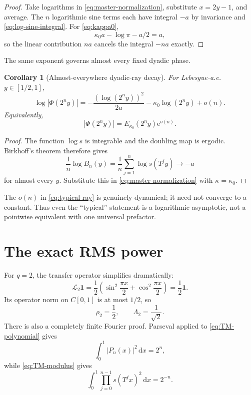 \documentclass[11pt,oneside]{article}
\newtheorem{corollary}[theorem]{Corollary}
\theoremstyle{definition}
\theoremstyle{remark}
\newcommand{\e}{\mathrm e}
\newcommand{\dd}{\,\mathrm d}
\newcommand{\Phiup}{\Phi}
\newcommand{\abs}[1]{\left|#1\right|}
\begin{document}
\begin{proof}
Take logarithms in \eqref{eq:master-normalization}, substitute $x=2y-1$, and average.
The $n$ logarithmic sine terms each have integral $-a$ by invariance and
\eqref{eq:log-sine-integral}.  For \eqref{eq:kappa0},
\[
 \kappa_0a-\log\pi-a/2=a,
\]
so the linear contribution $na$ cancels the integral $-na$ exactly.
\end{proof}

The same exponent governs almost every fixed dyadic phase.

\begin{corollary}[Almost-everywhere dyadic-ray decay]
\label{cor:typical-ray}
For Lebesgue-a.e. $y\in[1/2,1]$,
\begin{equation}
 \log\abs{\Phiup(2^ny)}
 =-\frac{(\log(2^ny))^2}{2a}
  -\kappa_0\log(2^ny)+o(n).
 \label{eq:typical-ray}
\end{equation}
Equivalently,
\[
 \abs{\Phiup(2^ny)}=E_{\kappa_0}(2^ny)\e^{o(n)}.
\]
\end{corollary}

\begin{proof}
The function $\log s$ is integrable and the doubling map is ergodic.  Birkhoff's theorem
therefore gives
\[
 \frac1n\log B_n(y)=\frac1n\sum_{j=1}^{n}\log s(T^jy)\longrightarrow-a
\]
for almost every $y$.  Substitute this in \eqref{eq:master-normalization} with
$\kappa=\kappa_0$.
\end{proof}

The $o(n)$ in \eqref{eq:typical-ray} is genuinely dynamical; it need not converge to a
constant.  Thus even the ``typical'' statement is a logarithmic asymptotic, not a pointwise
equivalent with one universal prefactor.

\section{The exact RMS power}
\label{sec:RMS}

For $q=2$, the transfer operator simplifies dramatically:
\begin{equation}
 \mathcal L_2\mathbf1
 =\frac12\left(\sin^2\frac{\pi x}{2}+\cos^2\frac{\pi x}{2}\right)
 =\frac12\mathbf1.
 \label{eq:L2-one}
\end{equation}
Its operator norm on $C[0,1]$ is at most $1/2$, so
\begin{equation}
 \rho_2=\frac12,
 \qquad
 \Lambda_2=\frac1{\sqrt2}.
 \label{eq:rho2}
\end{equation}
There is also a completely finite Fourier proof.  Parseval applied to
\eqref{eq:TM-polynomial} gives
\[
 \int_0^1\abs{P_n(x)}^2\dd x=2^n,
\]
while \eqref{eq:TM-modulus} gives
\begin{equation}
 \int_0^1\prod_{j=0}^{n-1}s(T^jx)^2\dd x=2^{-n}.
 \label{eq:exact-L2-product}
\end{equation}
\end{document}
